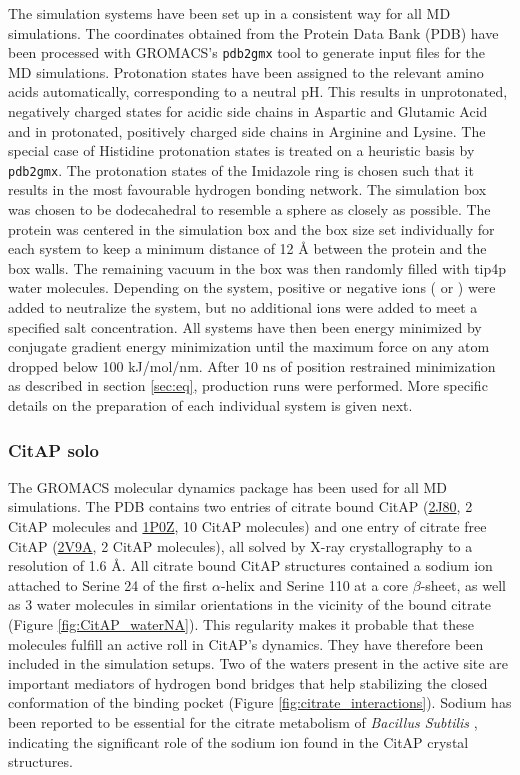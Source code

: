 \documentclass[english, a4paper, 12pt, titlepage, draft]{article}
\newcommand{\PDB}[1]{\href{http://pdb.rcsb.org/pdb/explore/explore.do?structureId=#1}{#1}}
\begin{document}
The simulation systems have been set up in a consistent way for all MD simulations.
The coordinates obtained from the Protein Data Bank (PDB) have been processed with GROMACS's \texttt{pdb2gmx} tool to generate input files for the MD simulations.
Protonation states have been assigned to the relevant amino acids automatically, corresponding to a neutral pH.
This results in unprotonated, negatively charged states for acidic side chains in Aspartic and Glutamic Acid and in protonated, positively charged side chains in Arginine and Lysine.
The special case of Histidine protonation states is treated on a heuristic basis by \texttt{pdb2gmx}.
The protonation states of the Imidazole ring is chosen such that it results in the most favourable hydrogen bonding network.
The simulation box was chosen to be dodecahedral to resemble a sphere as closely as possible.
The protein was centered in the simulation box and the box size set individually for each system to keep a minimum distance of 12 \r{A} between the protein and the box walls.
The remaining vacuum in the box was then randomly filled with tip4p water molecules.
Depending on the system, positive or negative ions ( or ) were added to neutralize the system, but no additional ions were added to meet a specified salt concentration.
All systems have then been energy minimized by conjugate gradient energy minimization until the maximum force on any atom dropped below 100 kJ/mol/nm.
After 10 ns of position restrained minimization as described in section \ref{sec:eq}, production runs were performed.
More specific details on the preparation of each individual system is given next.


\subsubsection{CitAP solo}

The GROMACS molecular dynamics package \cite{GROMACS4} has been used for all MD simulations.
The PDB contains two entries of citrate bound CitAP (\PDB{2J80}, 2 CitAP molecules and \PDB{1P0Z}, 10 CitAP molecules) and one entry of citrate free CitAP (\PDB{2V9A}, 2 CitAP molecules), all solved by X-ray crystallography to a resolution of 1.6 \r{A}.
All citrate bound CitAP structures contained a sodium ion attached to Serine 24 of the first $\alpha$-helix and Serine 110 at a core $\beta$-sheet, as well as 3 water molecules in similar orientations in the vicinity of the bound citrate (Figure \ref{fig:CitAP_waterNA}).
This regularity makes it probable that these molecules fulfill an active roll in CitAP's dynamics.
They have therefore been included in the simulation setups.
Two of the waters present in the active site are important mediators of hydrogen bond bridges that help stabilizing the closed conformation of the binding pocket (Figure \ref{fig:citrate_interactions}).
Sodium has been reported to be essential for the citrate metabolism of \emph{Bacillus Subtilis} \cite{CitA_NA}, indicating the significant role of the sodium ion found in the CitAP crystal structures.
\end{document}
